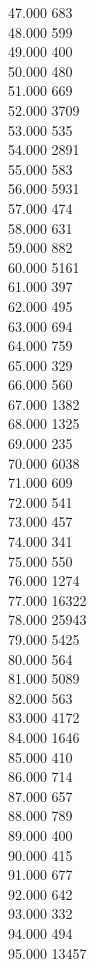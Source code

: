 { 47.000	683 \\
 48.000	599 \\
 49.000	400 \\
 50.000	480 \\
 51.000	669 \\
 52.000	3709 \\
 53.000	535 \\
 54.000	2891 \\
 55.000	583 \\
 56.000	5931 \\
 57.000	474 \\
 58.000	631 \\
 59.000	882 \\
 60.000	5161 \\
 61.000	397 \\
 62.000	495 \\
 63.000	694 \\
 64.000	759 \\
 65.000	329 \\
 66.000	560 \\
 67.000	1382 \\
 68.000	1325 \\
 69.000	235 \\
 70.000	6038 \\
 71.000	609 \\
 72.000	541 \\
 73.000	457 \\
 74.000	341 \\
 75.000	550 \\
 76.000	1274 \\
 77.000	16322 \\
 78.000	25943 \\
 79.000	5425 \\
 80.000	564 \\
 81.000	5089 \\
 82.000	563 \\
 83.000	4172 \\
 84.000	1646 \\
 85.000	410 \\
 86.000	714 \\
 87.000	657 \\
 88.000	789 \\
 89.000	400 \\
 90.000	415 \\
 91.000	677 \\
 92.000	642 \\
 93.000	332 \\
 94.000	494 \\
 95.000	13457 \\
}
